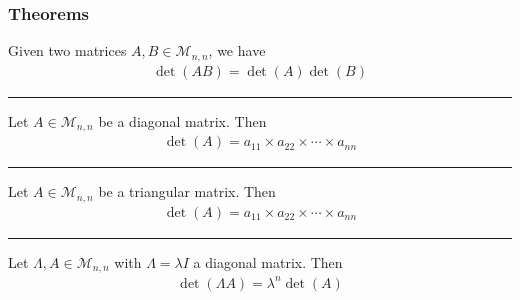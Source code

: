 \documentclass[usenames,dvipsnames,aspectratio=169,10pt]{beamer}
\numberwithin{equation}{section}
\begin{document}
\begin{frame}
\frametitle{Theorems}
\centering
Given two matrices $A,B\in \mathcal{M}_{n,n}$, we have
\begin{align*}
\det(AB)=\det(A)\det(B)
\end{align*}
\vspace{-1.3cm}\begin{center} \textcolor{airforceblue}{\rule{0.7\textwidth}{0.3mm}} \end{center}\vspace{-0.2cm}

Let $A\in\mathcal{M}_{n,n}$ be a diagonal matrix. Then
\begin{align*}
\det(A)=a_{11}\times a_{22} \times \cdots \times a_{nn}
\end{align*}
\vspace{-1.3cm}\begin{center} \textcolor{airforceblue}{\rule{0.7\textwidth}{0.3mm}} \end{center}\vspace{-0.2cm}

Let $A\in\mathcal{M}_{n,n}$ be a triangular matrix. Then
\begin{align*}
\det(A)=a_{11}\times a_{22} \times \cdots \times a_{nn}
\end{align*}
\vspace{-1.3cm}\begin{center} \textcolor{airforceblue}{\rule{0.7\textwidth}{0.3mm}} \end{center}\vspace{-0.2cm}

Let $\Lambda, A\in\mathcal{M}_{n,n}$ with $\Lambda=\lambda I$ a diagonal matrix. Then
\begin{align*}
\det(\Lambda A)=\lambda^n \det(A)
\end{align*}

\end{frame}
\end{document}
